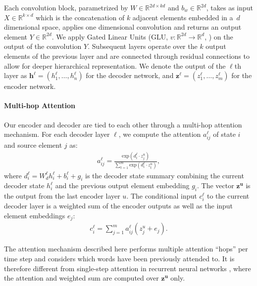 \documentclass[11pt,a4paper]{article}
\begin{document}
Each convolution block, parametrized by $W \in \mathbb{R}^{2d\times
  kd}$ and $b_w \in \mathbb{R}^{2d}$, takes as input $X \in
\mathbb{R}^{k\times d}$ which is the concatenation of $k$ adjacent
elements embedded in a~$d$ dimensional space, applies one dimensional
convolution and returns an output element $Y \in \mathbb{R}^{2d}$. We
apply Gated Linear Units (GLU, $v:\mathbb{R}^{2d} \rightarrow
\mathbb{R}^{d}$, \citeauthor{pmlr-v70-dauphin17a}
\citeyear{pmlr-v70-dauphin17a}) on the output of the convolution
$Y$. Subsequent layers operate over the $k$ output elements of the
previous layer and are connected through residual connections
\cite{He2016DeepRL} to allow for deeper hierarchical
representation. We denote the output of the $\ell$th layer as
$\mathbf{h^{\ell}} = (h^{\ell}_1, \ldots, h^{\ell}_n)$ for the decoder
network, and $\mathbf{z^{\ell}} = (z^{\ell}_1, \ldots, z^{\ell}_m)$
for the encoder network.

\paragraph{Multi-hop Attention}

Our encoder and decoder are tied to each other through a multi-hop
attention mechanism. For each decoder layer $\ell$, we compute the
attention $a^{\ell}_{ij}$ of state $i$ and source element $j$ as:
\begin{align}
a^{\ell}_{ij} = \frac{\mbox{exp}(d^{\ell}_i \cdot z^u_j)}{\sum^m_{t=1} \mbox{exp}(d^{\ell}_i \cdot z^u_t)}, \label{eq:attention}
\end{align}
\noindent where $d^{\ell}_i = W^{\ell}_dh^{\ell}_i+b^{\ell}_i+g_i$ is
the decoder state summary combining the current decoder state
$h^{\ell}_i$ and the previous output element embedding $g_i$. The
vector $\mathbf{z^u}$ is the output from the last encoder layer
$u$. The conditional input $c^{\ell}_i$ to the current decoder layer
is a weighted sum of the encoder outputs as well as the input element
embeddings $e_j$:
\begin{align}
c^{\ell}_i = \sum^m_{j=1} a^{\ell}_{ij}(z^u_j+e_j). \label{eq:decinput}
\end{align}

The attention mechanism described here performs multiple attention
``hops'' per time step and considers which words have been previously
attended to. It is therefore different from single-step attention in
recurrent neural networks \cite{bahdanau-arxiv14}, where the attention
and weighted sum are computed over $\mathbf{z^u}$ only.
\end{document}
